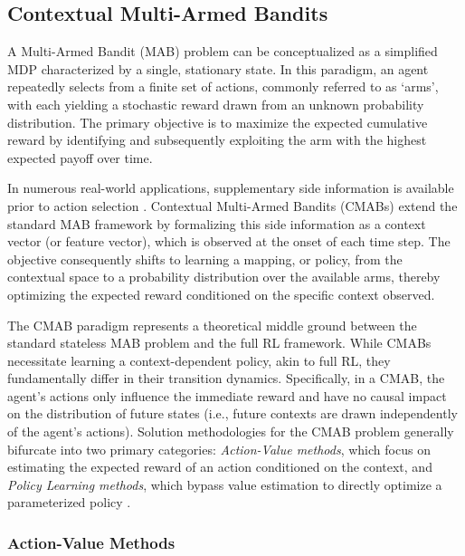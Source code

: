 \documentclass[pdflatex,sn-mathphys-num]{sn-jnl}
\theoremstyle{thmstyleone}%
\theoremstyle{thmstyletwo}%
\theoremstyle{thmstylethree}%
\begin{document}
\subsection{Contextual Multi-Armed Bandits}

A Multi-Armed Bandit (MAB) problem can be conceptualized as a simplified MDP characterized by a single, stationary state. In this paradigm, an agent repeatedly selects from a finite set of actions, commonly referred to as `arms', with each yielding a stochastic reward drawn from an unknown probability distribution. The primary objective is to maximize the expected cumulative reward by identifying and subsequently exploiting the arm with the highest expected payoff over time. 

In numerous real-world applications, supplementary side information is available prior to action selection \cite{bouneffouf2020survey}. Contextual Multi-Armed Bandits (CMABs) extend the standard MAB framework by formalizing this side information as a context vector (or feature vector), which is observed at the onset of each time step. The objective consequently shifts to learning a mapping, or policy, from the contextual space to a probability distribution over the available arms, thereby optimizing the expected reward conditioned on the specific context observed.

The CMAB paradigm represents a theoretical middle ground between the standard stateless MAB problem and the full RL framework. While CMABs necessitate learning a context-dependent policy, akin to full RL, they fundamentally differ in their transition dynamics. Specifically, in a CMAB, the agent's actions only influence the immediate reward and have no causal impact on the distribution of future states (i.e., future contexts are drawn independently of the agent's actions). Solution methodologies for the CMAB problem generally bifurcate into two primary categories: \emph{Action-Value methods}, which focus on estimating the expected reward of an action conditioned on the context, and \emph{Policy Learning methods}, which bypass value estimation to directly optimize a parameterized policy \cite{cortes2018adapting}.

\subsubsection{Action-Value Methods}
\end{document}

